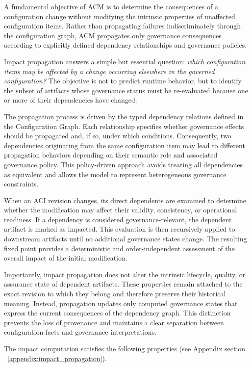 \documentclass[10pt]{article}
\begin{document}
A fundamental objective of ACM is to determine the consequences of a configuration change without modifying the intrinsic properties of unaffected configuration items. Rather than propagating failures indiscriminately through the configuration graph, ACM propagates only governance consequences according to explicitly defined dependency relationships and governance policies.

Impact propagation answers a simple but essential question: \emph{which configuration items may be affected by a change occurring elsewhere in the governed configuration?} The objective is not to predict runtime behavior, but to identify the subset of artifacts whose governance status must be re-evaluated because one or more of their dependencies have changed.

The propagation process is driven by the typed dependency relations defined in the Configuration Graph. Each relationship specifies whether governance effects should be propagated and, if so, under which conditions. Consequently, two dependencies originating from the same configuration item may lead to different propagation behaviors depending on their semantic role and associated governance policy. This policy-driven approach avoids treating all dependencies as equivalent and allows the model to represent heterogeneous governance constraints.

When an ACI revision changes, its direct dependents are examined to determine whether the modification may affect their validity, consistency, or operational readiness. If a dependency is considered governance-relevant, the dependent artifact is marked as impacted. This evaluation is then recursively applied to downstream artifacts until no additional governance states change. The resulting fixed point provides a deterministic and order-independent assessment of the overall impact of the initial modification.

Importantly, impact propagation does not alter the intrinsic lifecycle, quality, or assurance state of dependent artifacts. These properties remain attached to the exact revision to which they belong and therefore preserve their historical meaning. Instead, propagation updates only computed governance states that express the current consequences of the dependency graph. This distinction prevents the loss of provenance and maintains a clear separation between configuration facts and governance interpretations.

The impact computation satisfies the following properties (see Appendix section ~\ref{appendix:impact_propagation}).
\end{document}
